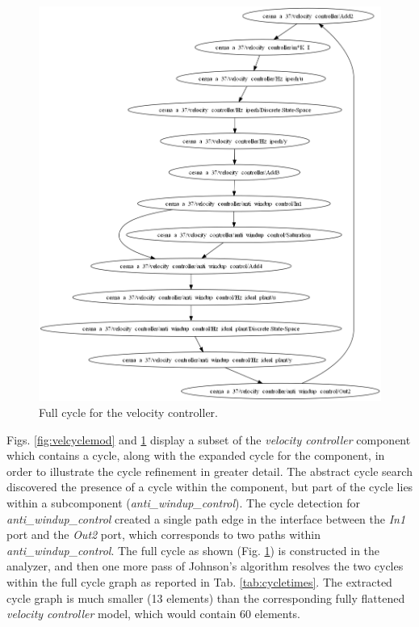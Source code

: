 \begin{figure}[htb]	
    \begin{center}
    \centerline{\includegraphics[width=\columnwidth]{figures/velocity_controller_cycle1.png}}
    \caption{Full cycle for the velocity controller.}
    \label{fig:velcycle}
    \end{center}	
\end{figure}

Figs. \ref{fig:velcyclemod} and \ref{fig:velcycle} display a subset of the \emph{velocity controller} component which contains a cycle, along with the expanded cycle for the component, in order to illustrate the cycle refinement in greater detail.
The abstract cycle search discovered the presence of a cycle within the component, but part of the cycle lies within a subcomponent (\emph{anti\_windup\_control}).  The cycle detection for \emph{anti\_windup\_control} created a single path
edge in the interface between the \emph{In1} port and the \emph{Out2} port, which corresponds to two paths within  \emph{anti\_windup\_control}.  The full 
cycle as shown (Fig. \ref{fig:velcycle}) is constructed in the analyzer, and then one more pass of Johnson's algorithm resolves the two cycles within the full cycle graph as reported in Tab. \ref{tab:cycletimes}.  The extracted cycle graph is much smaller (13 elements) than the corresponding fully flattened \emph{velocity controller} model, which would contain 60 elements.


